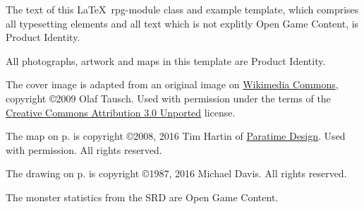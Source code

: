 \documentclass[letterpaper,serif]{rpg-module}
\begin{document}
\begin{productidentity}
\item The text of this \LaTeX~rpg-module class and example template, which comprises all typesetting elements and all text which
is not explitly Open Game Content, is Product Identity.
\modulecopyright

\item All photographs, artwork and maps in this template are Product Identity.

\item The cover image is adapted from an original image on
\href{https://commons.wikimedia.org/wiki/File:Karnak_Tempel_Vorhof_05.jpg}{Wikimedia Commons}, copyright \copyright 2009 Olaf
Tausch. Used with permission under the terms of the
\href{https://creativecommons.org/licenses/by/3.0/deed.en}{Creative Commons Attribution 3.0 Unported} license.

\item The map on p.\pageref{img:map} is copyright \copyright 2008, 2016 Tim Hartin of \href{http://paratime.ca}{Paratime Design}.
Used with permission. All rights reserved.

\item The drawing on p.\pageref{img:tomb} is copyright \copyright 1987, 2016 Michael Davis. All rights reserved.
\end{productidentity}

\begin{opengamecontent}
\item The monster statistics from the SRD are Open Game Content.
\end{opengamecontent}

\newpage

%
%

\tableofcontents

\end{document}
